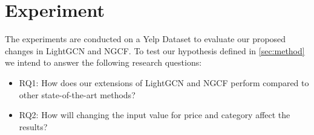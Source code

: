 \section{Experiment}
The experiments are conducted on a Yelp Dataset to evaluate our proposed changes in LightGCN and NGCF.
To test our hypothesis defined in \autoref{sec:method} we intend to answer the following research questions:
\begin{itemize}
    \item RQ1: How does our extensions of LightGCN and NGCF perform compared to other state-of-the-art methods?
    \item RQ2: How will changing the input value for price and category affect the results?
\end{itemize}






